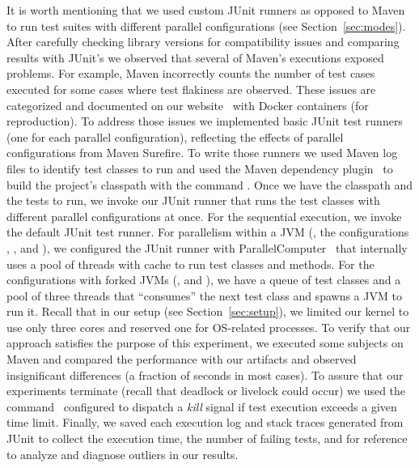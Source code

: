 It is worth mentioning that we used custom JUnit runners as opposed to
Maven to run test suites with
different parallel configurations (see Section~\ref{sec:modes}).
After carefully checking library versions for compatibility issues and
comparing results with JUnit's we observed that several of Maven's
executions exposed problems.  For example, Maven incorrectly counts
the number of test cases executed for some cases where test flakiness
are observed.  These issues are categorized and documented on our
website~\cite{ourwebpage} with Docker containers (for reproduction).
To address those issues we implemented basic JUnit test runners (one
for each parallel configuration), reflecting the effects of parallel
configurations from Maven Surefire.  To write those runners we used
Maven log files to identify test classes to run and used the Maven
dependency plugin~\cite{maven-dep} to build the project's classpath
with the command . Once we have
the classpath and the tests to run, we invoke our JUnit runner that
runs the test classes with different parallel configurations at
once. For the sequential execution, we invoke the default JUnit test
runner. For parallelism within a JVM (\ie, the configurations
\SeqClassParMeth{}, \ParClassSeqMeth{}, and \ParClassParMeth{}), we
configured the JUnit runner with
ParallelComputer~\cite{junit-parallel} that internally uses a pool of
threads with cache to run test classes and methods. For the
configurations with forked JVMs (\ie, \ForkSeq{} and \ForkParMeth{}),
we have a queue of test classes and a pool of three threads that
``consumes'' the next test class and spawns a JVM to run it.  Recall
that in our setup (see Section~\ref{sec:setup}), we limited our kernel
to use only three cores and reserved one for OS-related processes.  To
verify that our approach satisfies the purpose of this experiment, we
executed some subjects on Maven and compared the performance with our
artifacts and observed insignificant differences (a fraction of
seconds in most cases).  To assure that our experiments terminate
(recall that deadlock or livelock could occur) we used the
 command~\cite{timeout-cmd} configured to dispatch a
\emph{kill} signal if test execution exceeds a given time
limit. Finally, we saved each execution log and stack traces generated
from JUnit to collect the execution time, the number of failing tests,
and for reference to analyze and diagnose outliers in our results.

